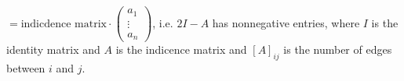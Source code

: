 $= \text{indicdence matrix} \cdot \begin{pmatrix} a_1 \\ \vdots \\ a_n \end{pmatrix}$, i.e. $2I- A$ has nonnegative entries, where $I$ is the identity matrix and $A$ is the indicence matrix and $[A]_{ij}$ is the number of edges between $i$ and $j$. 

































